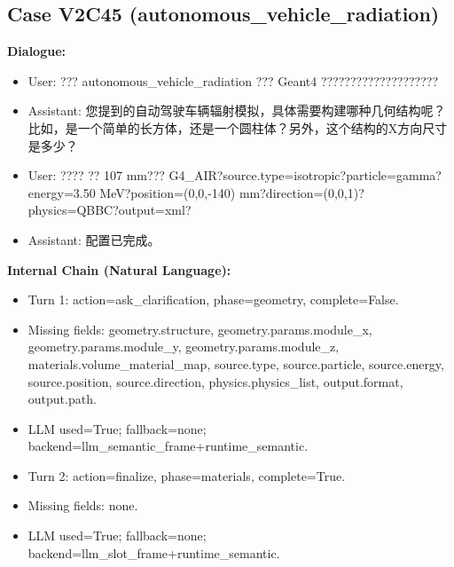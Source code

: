 \documentclass[11pt]{ctexart}
\begin{document}
\subsection{Case V2C45 (autonomous\_vehicle\_radiation)}
\textbf{Dialogue:}
\begin{itemize}
\item User: ??? autonomous\_vehicle\_radiation ??? Geant4 ????????????????????
\item Assistant: 您提到的自动驾驶车辆辐射模拟，具体需要构建哪种几何结构呢？比如，是一个简单的长方体，还是一个圆柱体？另外，这个结构的X方向尺寸是多少？
\item User: ???? ?? 107 mm??? G4\_AIR?source.type=isotropic?particle=gamma?energy=3.50 MeV?position=(0,0,-140) mm?direction=(0,0,1)?physics=QBBC?output=xml?
\item Assistant: 配置已完成。
\end{itemize}
\textbf{Internal Chain (Natural Language):}
\begin{itemize}
\item Turn 1: action=ask\_clarification, phase=geometry, complete=False.
\item Missing fields: geometry.structure, geometry.params.module\_x, geometry.params.module\_y, geometry.params.module\_z, materials.volume\_material\_map, source.type, source.particle, source.energy, source.position, source.direction, physics.physics\_list, output.format, output.path.
\item LLM used=True; fallback=none; backend=llm\_semantic\_frame+runtime\_semantic.
\item Turn 2: action=finalize, phase=materials, complete=True.
\item Missing fields: none.
\item LLM used=True; fallback=none; backend=llm\_slot\_frame+runtime\_semantic.
\end{itemize}
\end{document}
